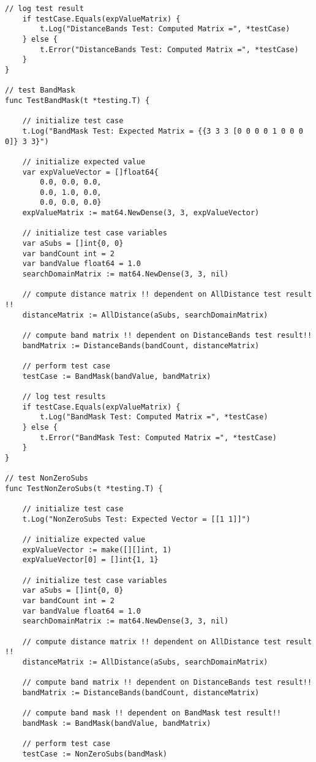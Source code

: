 \begin{lstlisting}[basicstyle=\tiny]
	// log test result
	if testCase.Equals(expValueMatrix) {
		t.Log("DistanceBands Test: Computed Matrix =", *testCase)
	} else {
		t.Error("DistanceBands Test: Computed Matrix =", *testCase)
	}
}

// test BandMask
func TestBandMask(t *testing.T) {

	// initialize test case
	t.Log("BandMask Test: Expected Matrix = {{3 3 3 [0 0 0 0 1 0 0 0 0]} 3 3}")

	// initialize expected value
	var expValueVector = []float64{
		0.0, 0.0, 0.0,
		0.0, 1.0, 0.0,
		0.0, 0.0, 0.0}
	expValueMatrix := mat64.NewDense(3, 3, expValueVector)

	// initialize test case variables
	var aSubs = []int{0, 0}
	var bandCount int = 2
	var bandValue float64 = 1.0
	searchDomainMatrix := mat64.NewDense(3, 3, nil)

	// compute distance matrix !! dependent on AllDistance test result !!
	distanceMatrix := AllDistance(aSubs, searchDomainMatrix)

	// compute band matrix !! dependent on DistanceBands test result!!
	bandMatrix := DistanceBands(bandCount, distanceMatrix)

	// perform test case
	testCase := BandMask(bandValue, bandMatrix)

	// log test results
	if testCase.Equals(expValueMatrix) {
		t.Log("BandMask Test: Computed Matrix =", *testCase)
	} else {
		t.Error("BandMask Test: Computed Matrix =", *testCase)
	}
}

// test NonZeroSubs
func TestNonZeroSubs(t *testing.T) {

	// initialize test case
	t.Log("NonZeroSubs Test: Expected Vector = [[1 1]]")

	// initialize expected value
	expValueVector := make([][]int, 1)
	expValueVector[0] = []int{1, 1}

	// initialize test case variables
	var aSubs = []int{0, 0}
	var bandCount int = 2
	var bandValue float64 = 1.0
	searchDomainMatrix := mat64.NewDense(3, 3, nil)

	// compute distance matrix !! dependent on AllDistance test result !!
	distanceMatrix := AllDistance(aSubs, searchDomainMatrix)

	// compute band matrix !! dependent on DistanceBands test result!!
	bandMatrix := DistanceBands(bandCount, distanceMatrix)

	// compute band mask !! dependent on BandMask test result!!
	bandMask := BandMask(bandValue, bandMatrix)

	// perform test case
	testCase := NonZeroSubs(bandMask)


\end{lstlisting}
